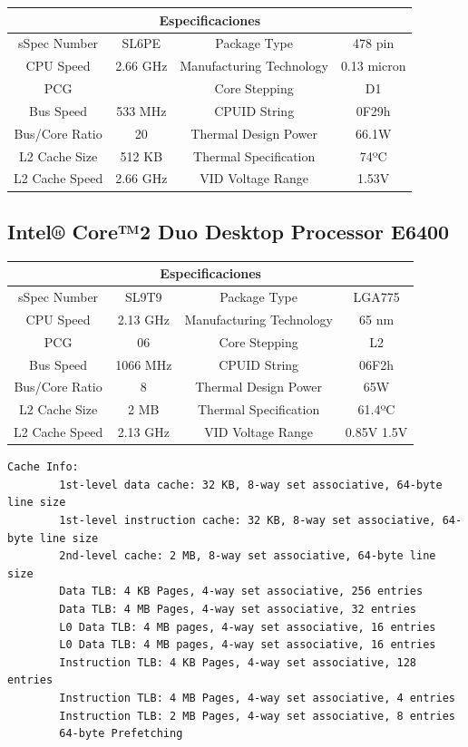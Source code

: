 \documentclass[a4paper,10pt]{article}
\begin{document}
\begin{tabular}{|c|c||c|c|}
\hline
\multicolumn{4}{|c|}{Especificaciones} \\
\hline
sSpec Number & SL6PE & Package Type & 478 pin \\
\hline
CPU Speed & 2.66 GHz & Manufacturing Technology & 0.13 micron \\
\hline
PCG & & Core Stepping & D1 \\
\hline
Bus Speed & 533 MHz & CPUID String & 0F29h \\
\hline
Bus/Core Ratio & 20 & Thermal Design Power & 66.1W \\
\hline
L2 Cache Size & 512 KB & Thermal Specification & 74ºC \\
\hline
L2 Cache Speed & 2.66 GHz & VID Voltage Range & 1.53V \\
\hline
\end{tabular}



\subsection{Intel® Core™2 Duo Desktop Processor E6400}

\begin{tabular}{|c|c||c|c|}
\hline
\multicolumn{4}{|c|}{Especificaciones} \\
\hline
sSpec Number  & SL9T9  & Package Type & LGA775 \\
\hline
CPU Speed  & 2.13 GHz  & Manufacturing Technology & 65 nm \\
\hline
PCG  & 06  & Core Stepping & L2 \\
\hline
Bus Speed  & 1066 MHz  & CPUID String & 06F2h \\
\hline
Bus/Core Ratio  & 8  & Thermal Design Power & 65W \\
\hline
L2 Cache Size  & 2 MB & Thermal Specification & 61.4ºC \\
\hline
L2 Cache Speed  & 2.13 GHz & VID Voltage Range & 0.85V  1.5V \\
\hline
\end{tabular}

\begin{verbatim}
Cache Info:
        1st-level data cache: 32 KB, 8-way set associative, 64-byte line size
        1st-level instruction cache: 32 KB, 8-way set associative, 64-byte line size
        2nd-level cache: 2 MB, 8-way set associative, 64-byte line size
        Data TLB: 4 KB Pages, 4-way set associative, 256 entries
        Data TLB: 4 MB Pages, 4-way set associative, 32 entries
        L0 Data TLB: 4 MB pages, 4-way set associative, 16 entries
        L0 Data TLB: 4 MB pages, 4-way set associative, 16 entries
        Instruction TLB: 4 KB Pages, 4-way set associative, 128 entries
        Instruction TLB: 4 MB Pages, 4-way set associative, 4 entries
        Instruction TLB: 2 MB Pages, 4-way set associative, 8 entries
        64-byte Prefetching
\end{verbatim}
\end{document}
